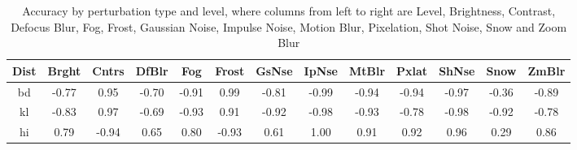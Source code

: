 \begin{table}[ht]
\centering
\begin{tabular}{|c|c|c|c|c|c|c|c|c|c|c|c|c|}
\hline
Dist & Brght & Cntrs & DfBlr & Fog & Frost & GsNse & IpNse & MtBlr & Pxlat & ShNse & Snow & ZmBlr \\
\hline
bd & -0.77 & 0.95 & -0.70 & -0.91 & 0.99 & -0.81 & -0.99 & -0.94 & -0.94 & -0.97 & -0.36 & -0.89 \\
kl & -0.83 & 0.97 & -0.69 & -0.93 & 0.91 & -0.92 & -0.98 & -0.93 & -0.78 & -0.98 & -0.92 & -0.78 \\
hi & 0.79 & -0.94 & 0.65 & 0.80 & -0.93 & 0.61 & 1.00 & 0.91 & 0.92 & 0.96 & 0.29 & 0.86 \\
\hline
\end{tabular}
\caption{Accuracy by perturbation type and level, where columns from left to right are Level, Brightness, Contrast, Defocus Blur, Fog, Frost, Gaussian Noise, Impulse Noise, Motion Blur, Pixelation, Shot Noise, Snow and Zoom Blur}
\label{CorrelationAccuracyvsnoiselevelsforallnoisetypes}
\end{table}